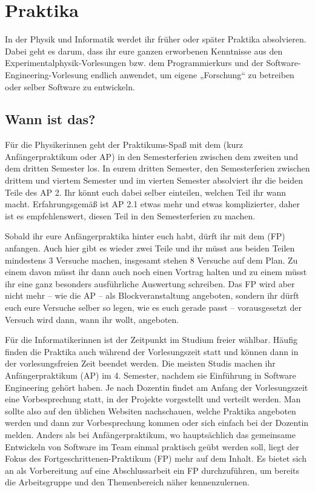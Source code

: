 \section{Praktika}

In der Physik und Informatik werdet ihr früher oder später Praktika absolvieren. Dabei geht es darum, dass ihr eure ganzen erworbenen Kenntnisse aus den Experimentalphysik-Vorlesungen bzw. dem Programmierkurs und der Software-Engineering-Vorlesung endlich anwendet, um eigene „Forschung“ zu betreiben oder selber Software zu entwickeln.

\subsection{Wann ist das?}

Für die Physikerinnen geht der Praktikums-Spaß mit dem  (kurz Anfängerpraktikum oder \gls{AP}) in den Semesterferien zwischen dem zweiten und dem dritten Semester los. In eurem dritten Semester, den Semesterferien zwischen drittem und viertem Semester und im vierten Semester absolviert ihr die beiden Teile des AP 2. Ihr könnt euch dabei selber einteilen, welchen Teil ihr wann macht. Erfahrungsgemäß ist AP 2.1 etwas mehr und etwas komplizierter, daher ist es empfehlenswert, diesen Teil in den Semesterferien zu machen.

Sobald ihr eure Anfängerpraktika hinter euch habt, dürft ihr mit dem  (\gls{FP}) anfangen. Auch hier gibt es wieder zwei Teile und ihr müsst aus beiden Teilen mindestens 3 Versuche machen, insgesamt stehen 8 Versuche auf dem Plan. Zu einem davon müsst ihr dann auch noch einen Vortrag halten und zu einem müsst ihr eine ganz besonders ausführliche Auswertung schreiben. Das \gls{FP} wird aber nicht mehr -- wie die \gls{AP} -- als Blockveranstaltung angeboten, sondern ihr dürft euch eure Versuche selber so legen, wie es euch gerade passt -- vorausgesetzt der Versuch wird dann, wann ihr wollt, angeboten.

Für die Informatikerinnen ist der Zeitpunkt im Studium freier wählbar. Häufig finden die Praktika auch während der Vorlesungszeit statt und können dann in der vorlesungsfreien Zeit beendet werden. Die meisten Studis machen ihr Anfängerpraktikum (\gls{AP}) im 4. Semester, nachdem sie Einführung in Software Engineering gehört haben. Je nach Dozentin findet am Anfang der Vorlesungszeit eine Vorbesprechung statt, in der Projekte vorgestellt und verteilt werden. Man sollte also auf den üblichen Websiten nachschauen, welche Praktika angeboten werden und dann zur Vorbesprechung kommen oder sich einfach bei der Dozentin melden.
Anders als bei Anfängerpraktikum, wo hauptsächlich das gemeinsame Entwickeln von Software im Team einmal praktisch geübt werden soll, liegt der Fokus des Fortgeschrittenen-Praktikum (\gls{FP}) mehr auf dem Inhalt. Es bietet sich an als Vorbereitung auf eine Abschlussarbeit ein FP durchzuführen, um bereits die Arbeitsgruppe und den Themenbereich näher kennenzulernen.


